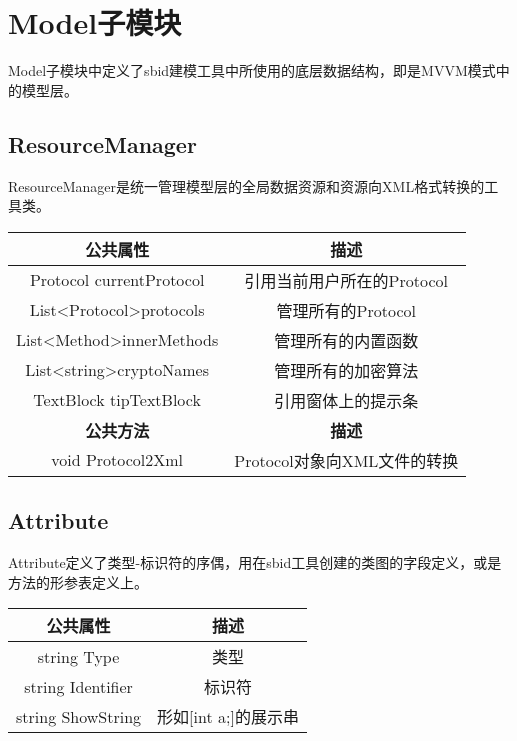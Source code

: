 \chapter{Model子模块}
Model子模块中定义了sbid建模工具中所使用的底层数据结构，即是MVVM模式中的模型层。

\section{ResourceManager}
ResourceManager是统一管理模型层的全局数据资源和资源向XML格式转换的工具类。
\begin{table}[h]
	\centering
	\begin{tabular}{|c|c|}
		\hline
		\textbf{公共属性}                                  & \textbf{描述}         \\ \hline
		Protocol currentProtocol                       & 引用当前用户所在的Protocol   \\ \hline
		List\textless{}Protocol\textgreater protocols  & 管理所有的Protocol       \\ \hline
		List\textless{}Method\textgreater innerMethods & 管理所有的内置函数           \\ \hline
		List\textless{}string\textgreater cryptoNames  & 管理所有的加密算法           \\ \hline
		TextBlock tipTextBlock                         & 引用窗体上的提示条           \\ \hline
		\textbf{公共方法}                                  & \textbf{描述}         \\ \hline
		void Protocol2Xml                       & Protocol对象向XML文件的转换 \\ \hline
	\end{tabular}
\end{table}

\section{Attribute}
Attribute定义了类型-标识符的序偶，用在sbid工具创建的类图的字段定义，或是方法的形参表定义上。
\begin{table}[h]
	\centering
	\begin{tabular}{|c|c|}
		\hline
		\textbf{公共属性}     & \textbf{描述}    \\ \hline
		string Type       & 类型             \\ \hline
		string Identifier & 标识符            \\ \hline
		string ShowString & 形如[int a;]的展示串 \\ \hline
	\end{tabular}
\end{table}

